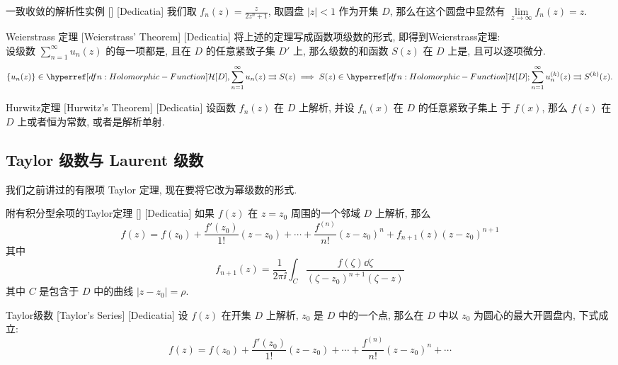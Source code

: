         \begin{xmp}
            {一致收敛的解析性实例}
            []
            [Dedicatia]
            我们取 \(f_n(z)=\frac{z}{2z^n+1}\), 取圆盘 \(|z|<1\) 作为开集 \(D\), 那么在这个圆盘中显然有 \(\lim\limits_{z\to\infty}f_n(z)=z\).
        \end{xmp}

        \begin{thm}
            [Weierstrass]
            {Weierstrass 定理}
            [Weierstrass' Theorem]
            [Dedicatia]
            将上述的定理写成函数项级数的形式, 即得到Weierstrass定理: \\
            设级数 \(\sum_{n = 1}^{\infty} u_n(z)\) 的每一项都是\Analytic{}, 且在 \(D\) 的任意紧致子集 \(D'\) 上\UniformConvergent{}, 那么级数的和函数 \(S(z)\) 在 \(D\) 上是\Analytic{}, 且可以逐项微分. 
            \[\{u_n(z)\}\in\Holo[D],\sum_{n = 1}^{\infty} u_n(z)\rightrightarrows S(z)\implies S(z)\in\Holo[D]; \sum_{n = 1}^{\infty} u_n^{(k)}(z)\rightrightarrows S^{(k)}(z).\]
        \end{thm}

        \begin{thm}
            [Hurwitz]
            {Hurwitz定理}
            [Hurwitz's Theorem]
            [Dedicatia]
            设函数 \(f_n(z)\) 在 \(D\) 上解析, 并设 \(f_n(x)\) 在 \(D\) 的任意紧致子集上\UniformConvergent{} 于 \(f(x)\), 那么 \(f(z)\) 在 \(D\) 上或者恒为常数, 或者是解析单射.
        \end{thm}
    
    \subsection{Taylor 级数与 Laurent 级数}

        我们之前讲过的有限项 Taylor 定理, 现在要将它改为幂级数的形式. 

        \begin{thm}
            {附有积分型余项的Taylor定理}
            []
            [Dedicatia]
            如果 \(f(z)\) 在 \(z=z_0\) 周围的一个邻域 \(D\) 上解析, 那么
            \[f(z)=f(z_0)+\frac{f'(z_0)}{1!}(z-z_0)+\cdots+\frac{f^{(n)}}{n!}(z-z_0)^n+f_{n+1}(z)(z-z_0)^{n+1}\]
            其中
            \[f_{n+1}(z)=\frac{1}{2\pi\ii}\int_C\frac{f(\zeta)\dd{\zeta}}{(\zeta-z_0)^{n+1}(\zeta-z)}\]
            其中 \(C\) 是包含于 \(D\) 中的曲线 \(|z-z_0|=\rho\). 
        \end{thm}

        \begin{thm}
            {Taylor级数}
            [Taylor's Series]
            [Dedicatia]
            设 \(f(z)\) 在开集 \(D\) 上解析,  \(z_0\) 是 \(D\) 中的一个点, 那么在 \(D\) 中以 \(z_0\) 为圆心的最大开圆盘内, 下式成立: 
            \[f(z)=f(z_0)+\frac{f'(z_0)}{1!}(z-z_0)+\cdots+\frac{f^{(n)}}{n!}(z-z_0)^n+\cdots\]
        \end{thm}

